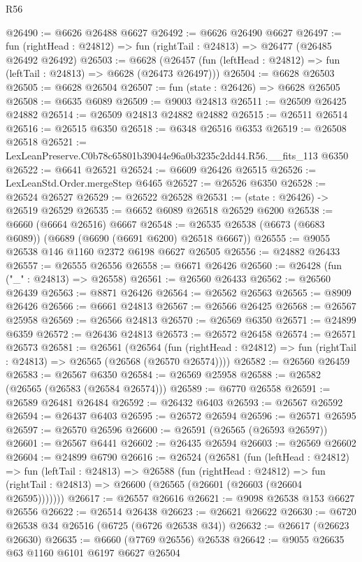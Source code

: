 \begin{lexlean}{R56}
\begin{coremodule}
@26490 := @6626 @26488 @6627
@26492 := @6626 @26490 @6627
@26497 := fun (rightHead : @24812) => fun (rightTail : @24813) => @26477 (@26485 @26492 @26492)
@26503 := @6628
    (@26457 (fun (leftHead : @24812) => fun (leftTail : @24813) => @6628 (@26473 @26497)))
@26504 := @6628 @26503
@26505 := @6628 @26504
@26507 := fun (state : @26426) => @6628 @26505
@26508 := @6635 @6089
@26509 := @9003 @24813
@26511 := @26509 @26425 @24882
@26514 := @26509 @24813 @24882 @24882
@26515 := @26511 @26514
@26516 := @26515 @6350
@26518 := @6348 @26516 @6353
@26519 := @26508 @26518
@26521 := LexLeanPreserve.C0b78c65801b39044e96a0b3235c2dd44.R56.__fits_113 @6350
@26522 := @6641 @26521
@26524 := @6609 @26426 @26515
@26526 := LexLeanStd.Order.mergeStep @6465
@26527 := @26526 @6350
@26528 := @26524 @26527
@26529 := @26522 @26528
@26531 := (state : @26426) -> @26519 @26529
@26535 := @6652 @6089 @26518 @26529 @6200
@26538 := @6660 (@6664 @26516) @6667
@26548 := @26535 @26538 (@6673 (@6683 @6089)) (@6689 (@6690 (@6691 @6200) @26518 @6667))
@26555 := @9055 @26538 @146 @1160 @2372 @6198 @6627 @26505
@26556 := @24882 @26433
@26557 := @26555 @26556
@26558 := @6671 @26426
@26560 := @26428 (fun ("_" : @24813) => @26558)
@26561 := @26560 @26433
@26562 := @26560 @26439
@26563 := @8871 @26426
@26564 := @26562 @26563
@26565 := @8909 @26426
@26566 := @6661 @24813
@26567 := @26566 @26425
@26568 := @26567 @25958
@26569 := @26566 @24813
@26570 := @26569 @6350
@26571 := @24899 @6359
@26572 := @26436 @24813
@26573 := @26572 @26458
@26574 := @26571 @26573
@26581 := @26561
    (@26564
      (fun (rightHead : @24812) => fun (rightTail : @24813) => @26565 (@26568 (@26570 @26574))))
@26582 := @26560 @26459
@26583 := @26567 @6350
@26584 := @26569 @25958
@26588 := @26582 (@26565 (@26583 (@26584 @26574)))
@26589 := @6770 @26558
@26591 := @26589 @26481 @26484
@26592 := @26432 @6403
@26593 := @26567 @26592
@26594 := @26437 @6403
@26595 := @26572 @26594
@26596 := @26571 @26595
@26597 := @26570 @26596
@26600 := @26591 (@26565 (@26593 @26597))
@26601 := @26567 @6441
@26602 := @26435 @26594
@26603 := @26569 @26602
@26604 := @24899 @6790
@26616 := @26524
    (@26581
      (fun (leftHead : @24812) =>
      fun (leftTail : @24813) =>
      @26588
        (fun (rightHead : @24812) =>
        fun (rightTail : @24813) => @26600 (@26565 (@26601 (@26603 (@26604 @26595)))))))
@26617 := @26557 @26616
@26621 := @9098 @26538 @153 @6627 @26556
@26622 := @26514 @26438
@26623 := @26621 @26622
@26630 := @6720 @26538 @34 @26516 (@6725 (@6726 @26538 @34))
@26632 := @26617 (@26623 @26630)
@26635 := @6660 (@7769 @26556) @26538
@26642 := @9055 @26635 @63 @1160 @6101 @6197 @6627 @26504

\end{coremodule}
\end{lexlean}
